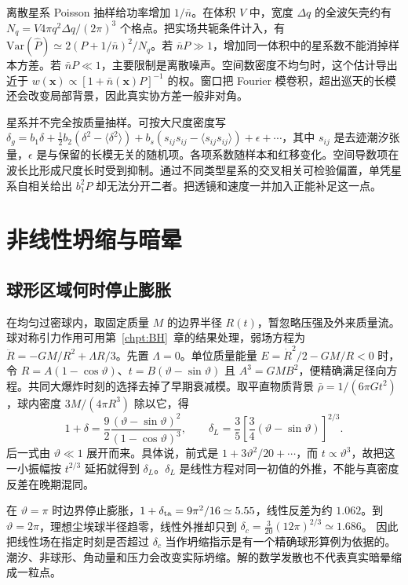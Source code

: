 离散星系 Poisson 抽样给功率增加 $1/\bar n$。在体积 $V$ 中，宽度 $\Delta q$ 的全波矢壳约有 $N_q=V4\pi q^2\Delta q/(2\pi)^3$ 个格点。把实场共轭条件计入，有 $\mathrm{Var}(\widehat P)\simeq2(P+1/\bar n)^2/N_q$。若 $\bar nP\gg1$，增加同一体积中的星系数不能消掉样本方差。若 $\bar nP\ll1$，主要限制是离散噪声。空间数密度不均匀时，这个估计导出近于 $w(\bm x)\propto[1+\bar n(\bm x)P]^{-1}$ 的权。窗口把 Fourier 模卷积，超出巡天的长模还会改变局部背景，因此真实协方差一般非对角。

星系并不完全按质量抽样。可按大尺度密度写 $\delta_g=b_1\delta+\frac12b_2(\delta^2-\langle\delta^2\rangle)+b_s(s_{ij}s_{ij}-\langle s_{ij}s_{ij}\rangle)+\epsilon+\cdots$，其中 $s_{ij}$ 是去迹潮汐张量，$\epsilon$ 是与保留的长模无关的随机项。各项系数随样本和红移变化。空间导数项在波长比形成尺度长时受到抑制。通过不同类型星系的交叉相关可检验偏置，单凭星系自相关给出 $b_1^2P$ 却无法分开二者。把透镜和速度一并加入正能补足这一点。
\section{非线性坍缩与暗晕}\label{sec:cosmo-halos}

\subsection{球形区域何时停止膨胀}

在均匀过密球内，取固定质量 $M$ 的边界半径 $R(t)$，暂忽略压强及外来质量流。球对称引力作用可用第~\ref{chpt:BH}~章的结果处理，弱场方程为 $\ddot R=-GM/R^2+\Lambda R/3$。先置 $\Lambda=0$。单位质量能量 $E=\dot R^2/2-GM/R<0$ 时，令 $R=A(1-\cos\vartheta)$、$t=B(\vartheta-\sin\vartheta)$ 且 $A^3=GMB^2$，便精确满足径向方程。共同大爆炸时刻的选择去掉了早期衰减模。取平直物质背景 $\bar\rho=1/(6\pi Gt^2)$，球内密度 $3M/(4\pi R^3)$ 除以它，得
\begin{equation}\label{eq:cosmo-spherical}
 1+\delta=\frac92\frac{(\vartheta-\sin\vartheta)^2}{(1-\cos\vartheta)^3},
 \qquad
 \delta_L=\frac35\left[\frac34(\vartheta-\sin\vartheta)\right]^{2/3}.
\end{equation}
后一式由 $\vartheta\ll1$ 展开而来。具体说，前式是 $1+3\vartheta^2/20+\cdots$，而 $t\propto\vartheta^3$，故把这一小振幅按 $t^{2/3}$ 延拓就得到 $\delta_L$。$\delta_L$ 是线性方程对同一初值的外推，不能与真密度反差在晚期混同。

在 $\vartheta=\pi$ 时边界停止膨胀，$1+\delta_{\rm ta}=9\pi^2/16\simeq5.55$，线性反差为约 $1.062$。到 $\vartheta=2\pi$，理想尘埃球半径趋零，线性外推却只到 $\delta_c=\frac3{20}(12\pi)^{2/3}\simeq1.686$。
因此把线性场在指定时刻是否超过 $\delta_c$ 当作坍缩指示是有一个精确球形算例为依据的。潮汐、非球形、角动量和压力会改变实际坍缩。解的数学发散也不代表真实暗晕缩成一粒点。

